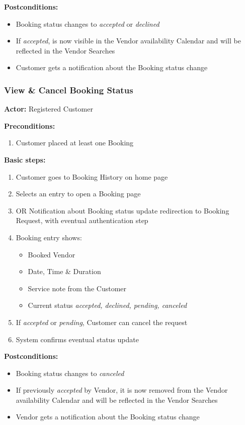 \documentclass[11pt,a4paper]{article}
\begin{document}
\noindent \textbf{Postconditions:}
\begin{itemize}
  \item Booking status changes to \textit{accepted} or \textit{declined}
  \item If \textit{accepted}, is now visible in the Vendor
    availability Calendar and will be reflected in the Vendor Searches
  \item Customer gets a notification about the Booking status change
\end{itemize}

\subsubsection{View \& Cancel Booking Status}

\textbf{Actor:} Registered Customer

\noindent \textbf{Preconditions:}
\begin{enumerate}
  \item Customer placed at least one Booking
\end{enumerate}

\noindent \textbf{Basic steps:}
\begin{enumerate}
  \item Customer goes to Booking History on home page
  \item Selects an entry to open a Booking page
  \item OR Notification about Booking status update redirection to
    Booking Request, with eventual authentication step
  \item Booking entry shows:
    \begin{itemize}
      \item Booked Vendor
      \item Date, Time \& Duration
      \item Service note from the Customer
      \item Current status \textit{accepted, declined, pending, canceled}
    \end{itemize}
  \item If \textit{accepted} or \textit{pending}, Customer can cancel
    the request
  \item System confirms eventual status update
\end{enumerate}

\noindent \textbf{Postconditions:}
\begin{itemize}
  \item Booking status changes to \textit{canceled}
  \item If previously \textit{accepted} by Vendor, it is now
    removed from the Vendor availability Calendar and will be
    reflected in the Vendor Searches
  \item Vendor gets a notification about the Booking status change
\end{itemize}
\end{document}
